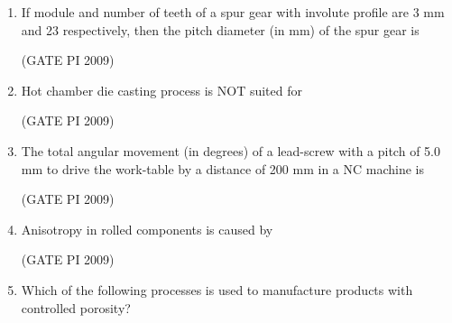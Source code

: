 \documentclass[journal,12pt,onecolumn]{IEEEtran}
\theoremstyle{remark}
\begin{document}
\begin{enumerate}
\item If module and number of teeth of a spur gear with involute profile are 3 mm and 23 respectively, then the pitch diameter (in mm) of the spur gear is
\begin{enumerate}
\end{enumerate}
\hfill (GATE PI 2009)
\item Hot chamber die casting process is NOT suited for
\begin{enumerate}
\end{enumerate}
\hfill (GATE PI 2009)
\item The total angular movement (in degrees) of a lead-screw with a pitch of 5.0 mm to drive the work-table by a distance of 200 mm in a NC machine is \\
\begin{enumerate}
 \end{enumerate}
\hfill (GATE PI 2009)
\item Anisotropy in rolled components is caused by
\begin{enumerate}
\end{enumerate}
\hfill (GATE PI 2009)
\item Which of the following processes is used to manufacture products with controlled porosity?

\end{enumerate}
\end{document}
